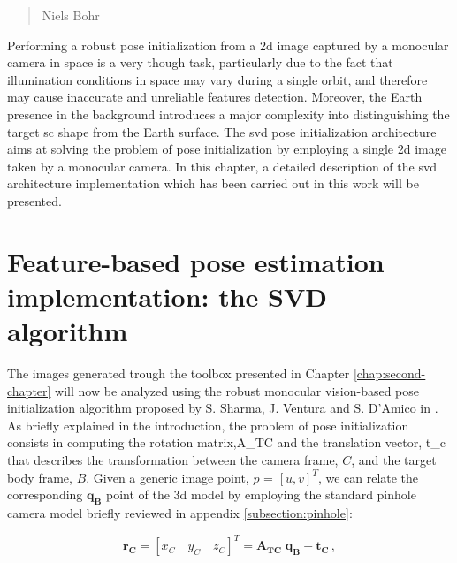 \begin{quotation}
  {\footnotesize
    \begin{flushright}
      Niels Bohr
    \end{flushright}
  }
\end{quotation}
\vspace{0.5cm}

Performing a robust pose initialization from a \acrshort{2d} image captured by a monocular camera in space is a very though task, particularly due to the fact that illumination conditions in space may vary during a single orbit, and therefore may cause inaccurate and unreliable features detection. Moreover, the Earth presence in the background introduces a major complexity into distinguishing the target \acrshort{sc} shape from the Earth surface. The \acrshort{svd} pose initialization architecture aims at solving the problem of pose initialization by employing a single \acrshort{2d} image taken by a monocular camera. In this chapter, a detailed description of the \acrshort{svd} architecture implementation which has been carried out in this work will be presented.

\section{Feature-based pose estimation implementation: the SVD algorithm}
The images generated  trough the toolbox presented in Chapter \ref{chap:second-chapter} will now be analyzed using the robust monocular vision-based pose initialization algorithm proposed by S. Sharma, J. Ventura and S. D'Amico in \cite{Sharma2018}.
As briefly explained in the introduction, the problem of pose initialization consists in computing the rotation matrix,\gls{A_TC} and the translation vector, \gls{t_c} that describes the transformation between the camera frame, $C$, and the target body frame, $B$. Given a generic image point, $p$ = $ [u,v]^T $, we can relate the corresponding $\mathbf{q_B}$ point of the \acrshort{3d} model by employing the standard pinhole camera model briefly reviewed in appendix \ref{subsection:pinhole}:

\begin{equation}
  \mathbf{r_C} = \left[x_C \quad  y_C \quad z_C\right]^T = \mathbf{A_{TC}} \; \mathbf{q_B} + \mathbf{t_C} \,,
  \label{eq:rc}
\end{equation}

